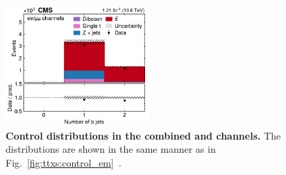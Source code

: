 \begin{figure}[!hp]
\hfill
\includegraphics[width=0.49\textwidth]{figures/ttxs/nbtag_eemm.pdf}
\caption{
    \textbf{Control distributions in the combined \ee and \mumu channels.} The distributions are shown in the same manner as in Fig.~\ref{fig:ttxs:control_em}~\cite{CMS:TOP-22-012}.
}
\label{fig:ttxs:control_eemm}
\end{figure}

